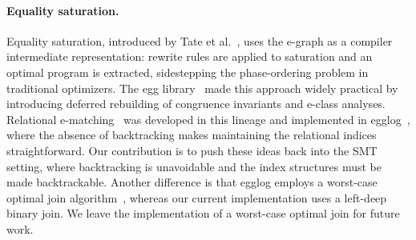 \paragraph{Equality saturation.}
Equality saturation, introduced by Tate et al.~\cite{eqsat}, uses the
e-graph as a compiler intermediate representation: rewrite rules are applied to
saturation and an optimal program is extracted, sidestepping the
phase-ordering problem in traditional optimizers. The egg library~\cite{egg}
made this approach widely practical by introducing deferred rebuilding of
congruence invariants and e-class analyses. Relational
e-matching~\cite{relationalematching} was developed in this lineage and
implemented in egglog~\cite{egglog}, where the absence of backtracking makes
maintaining the relational indices straightforward. Our contribution is to push
these ideas back into the SMT setting, where backtracking is unavoidable and the
index structures must be made backtrackable. Another difference is that egglog 
employs a worst-case optimal join algorithm~\cite{wcoj}, whereas our current implementation uses a
left-deep binary join. We leave the implementation of a worst-case optimal
join for future work.
